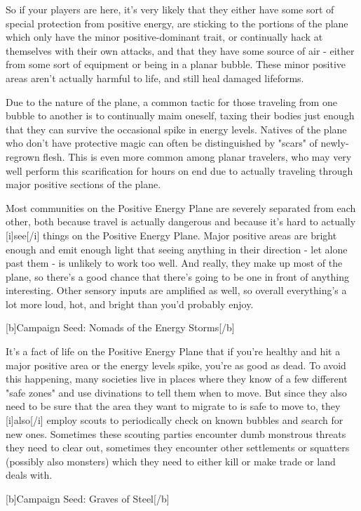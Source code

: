 So if your players are here, it's very likely that they either have some sort of special protection from positive energy, are sticking to the portions of the plane which only have the minor positive-dominant trait, or continually hack at themselves with their own attacks, and that they have some source of air - either from some sort of equipment or being in a planar bubble. These minor positive areas aren't actually harmful to life, and still heal damaged lifeforms.

Due to the nature of the plane, a common tactic for those traveling from one bubble to another is to continually maim oneself, taxing their bodies just enough that they can survive the occasional spike in energy levels. Natives of the plane who don't have protective magic can often be distinguished by "scars" of newly-regrown flesh. This is even more common among planar travelers, who may very well perform this scarification for hours on end due to actually traveling through major positive sections of the plane.

Most communities on the Positive Energy Plane are severely separated from each other, both because travel is actually dangerous and because it's hard to actually [i]see[/i] things on the Positive Energy Plane. Major positive areas are bright enough and emit enough light that seeing anything in their direction - let alone past them - is unlikely to work too well. And really, they make up most of the plane, so there's a good chance that there's going to be one in front of anything interesting. Other sensory inputs are amplified as well, so overall everything's a lot more loud, hot, and bright than you'd probably enjoy.

[b]Campaign Seed: Nomads of the Energy Storms[/b]

It's a fact of life on the Positive Energy Plane that if you're healthy and hit a major positive area or the energy levels spike, you're as good as dead. To avoid this happening, many societies live in places where they know of a few different "safe zones" and use divinations to tell them when to move. But since they also need to be sure that the area they want to migrate to is safe to move to, they [i]also[/i] employ scouts to periodically check on known bubbles and search for new ones. Sometimes these scouting parties encounter dumb monstrous threats they need to clear out, sometimes they encounter other settlements or squatters (possibly also monsters) which they need to either kill or make trade or land deals with.

[b]Campaign Seed: Graves of Steel[/b]

